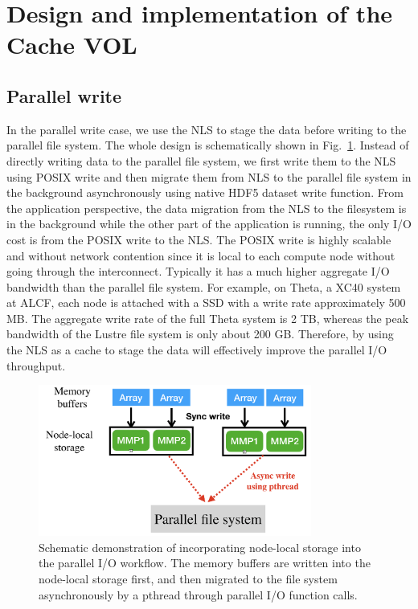 \documentclass[aps, rmp, 11pt, notitlepage]{revtex4-1}
\begin{document}
\section{Design and implementation of the Cache VOL} \label{sec:design}
\subsection{Parallel write}
In the parallel write case, we use the NLS to stage the data before writing to the parallel file system. The whole design is schematically shown in Fig.~\ref{fig:schematic}. Instead of directly writing data to the parallel file system, we first write them to the NLS using POSIX write and then migrate them from NLS to the parallel file system in the background asynchronously using native HDF5 dataset write function. From the application perspective, the data migration from the NLS to the filesystem is in the background while the other part of the application is running, the only I/O cost is from the POSIX write to the NLS. The POSIX write is highly scalable and without network contention since it is local to each compute node without going through the interconnect. Typically it has a much higher aggregate I/O bandwidth than the parallel file system. For example, on Theta, a XC40 system at ALCF, each node is attached with a SSD with a write rate approximately 500 MB. The aggregate write rate of the full Theta system is 2 TB, whereas the peak bandwidth of the Lustre file system is only about 200 GB. Therefore, by using the NLS as a cache to stage the data will effectively improve the parallel I/O throughput. 
\begin{figure}[hbt]
\centering
\includegraphics[width=0.8\textwidth]{schematic.png}
\caption{Schematic demonstration of incorporating node-local storage into the parallel I/O workflow. The memory buffers are written into the node-local storage first, and then migrated to the file system asynchronously by a pthread through parallel I/O function calls.}\label{fig:schematic}
\end{figure} 
\end{document}
